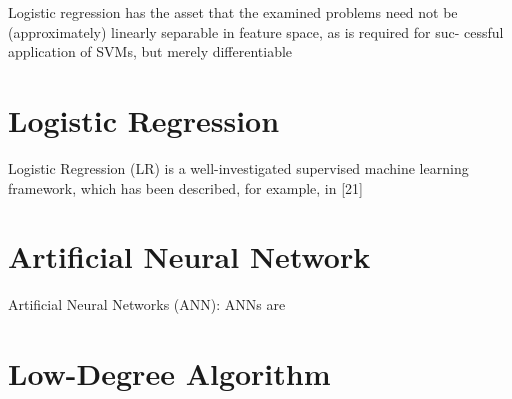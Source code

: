 Logistic regression has the asset that the examined problems need not be (approximately) linearly separable in feature space, as is required for suc- cessful application of SVMs, but merely differentiable \cite{Ruhrmair2010ModelingFunctions}


\section{Logistic Regression}
\label{sec:lr}
Logistic Regression (LR) is a well-investigated supervised machine learning framework, which has been described, for example, in [21] \cite{Ruhrmair2010ModelingFunctions}


\section{Artificial Neural Network}
\label{sec:neuralnetwork}

Artificial Neural Networks (ANN): ANNs are \cite{Hospodar2012MachineUsability}


\section{Low-Degree Algorithm}
\label{sec:lowdegreealg}





